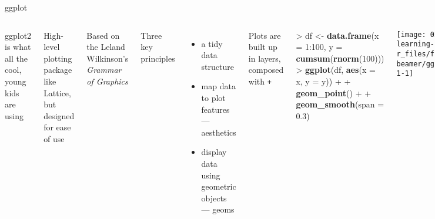 \documentclass[10pt,ignorenonframetext,compress, aspectratio=169]{beamer}
\newenvironment{Shaded}{\begin{snugshade}}{\end{snugshade}}
\newcommand{\KeywordTok}[1]{\textcolor[rgb]{0.13,0.29,0.53}{\textbf{{#1}}}}
\newcommand{\DataTypeTok}[1]{\textcolor[rgb]{0.13,0.29,0.53}{{#1}}}
\newcommand{\DecValTok}[1]{\textcolor[rgb]{0.00,0.00,0.81}{{#1}}}
\newcommand{\FloatTok}[1]{\textcolor[rgb]{0.00,0.00,0.81}{{#1}}}
\newcommand{\StringTok}[1]{\textcolor[rgb]{0.31,0.60,0.02}{{#1}}}
\newcommand{\NormalTok}[1]{{#1}}
\providecommand{\tightlist}{%
  \setlength{\itemsep}{0pt}\setlength{\parskip}{0pt}}
\newcommand{\columnsbegin}{\begin{columns}}
\newcommand{\columnsend}{\end{columns}}
\begin{document}
\begin{frame}[fragile]{ggplot}

\columnsbegin
{}

\alert{ggplot2} is what all the cool, young kids are using

High-level plotting package like Lattice, but designed for ease of use

Based on the Leland Wilkinson's \emph{Grammar of Graphics}

Three key principles

\begin{itemize}
\tightlist
\item
  a tidy data structure
\item
  map data to plot features --- \alert{aesthetics}
\item
  display data using geometric objects --- \alert{geoms}
\end{itemize}

Plots are built up in layers, composed with \texttt{+}


\begin{Shaded}
\begin{Highlighting}[]
\NormalTok{>}\StringTok{ }\NormalTok{df <-}\StringTok{ }\KeywordTok{data.frame}\NormalTok{(}\DataTypeTok{x =} \DecValTok{1}\NormalTok{:}\DecValTok{100}\NormalTok{, }\DataTypeTok{y =} \KeywordTok{cumsum}\NormalTok{(}\KeywordTok{rnorm}\NormalTok{(}\DecValTok{100}\NormalTok{)))}
\NormalTok{>}\StringTok{ }\KeywordTok{ggplot}\NormalTok{(df, }\KeywordTok{aes}\NormalTok{(}\DataTypeTok{x =} \NormalTok{x, }\DataTypeTok{y =} \NormalTok{y)) +}
\NormalTok{+}\StringTok{     }\KeywordTok{geom_point}\NormalTok{() +}
\NormalTok{+}\StringTok{     }\KeywordTok{geom_smooth}\NormalTok{(}\DataTypeTok{span =} \FloatTok{0.3}\NormalTok{)}
\end{Highlighting}
\end{Shaded}

\begin{center}\texttt{[image: 02-learning-r\_files/figure-beamer/ggplot-1-1]} \end{center}

\columnsend

\end{frame}
\end{document}
